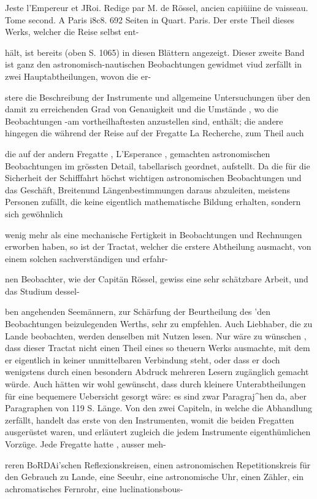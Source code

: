 \documentclass[10pt,a4paper]{article}
\begin{document}
Jeste l'Empereur et JRoi. Redige par M. de Rössel, ancien capiüiine de vaisseau. Tome second. A Paris i8c8. 692 Seiten in Quart. Paris. Der erste Theil dieses Werks, welcher die Reise selbst ent-

hält, ist bereits (oben S. 1065) in diesen Blättern angezeigt. Dieser zweite Band ist ganz den astronomisch-nautischen Beobachtungen gewidmet viud zerfällt in zwei Hauptabtheilungen, wovon die er-

stere die Beschreibung der Instrumente und allgemeine Untersuchungen über den damit zu erreichenden Grad von Genauigkeit und die Umstände , wo die Beobachtungen -am vortheilhaftesten anzustellen sind, enthält; die andere hingegen die während der Reise auf der Fregatte La Recherche, zum Theil auch

die auf der andern Fregatte , L'Esperance , gemachten astronomischen Beobachtungen im grössten Detail, tabellarisch geordnet, aufstellt. Da die für die Sicherheit der Schifffahrt höchst wichtigen astronomischen Beobachtungen und das Geschäft, Breitenund Längenbestimmungen daraus abzuleiten, meistens Personen zufällt, die keine eigentlich mathematische Bildung erhalten, sondern sich gewöhnlich

wenig mehr als eine mechanische Fertigkeit in Beobachtungen und Rechnungen erworben haben, so ist der Tractat, welcher die erstere Abtheilung ausmacht, von einem solchen sachverständigen und erfahr-

nen Beobachter, wie der Capitän Rössel, gewiss eine sehr schätzbare Arbeit, und das Studium dessel-

ben angehenden Seemännern, zur Schärfung der Beurtheilung des 'den Beobachtungen beizulegenden Werths, sehr zu empfehlen. Auch Liebhaber, die zu Lande beobachten, werden denselben mit Nutzen lesen. Nur wäre zu wünschen , dass dieser Tractat nicht einen Theil eines so theuern Werks ausmachte, mit dem er eigentlich in keiner unmittelbaren Verbindung steht, oder dass er doch wenigstens durch einen besondern Abdruck mehreren Lesern zugänglich gemacht würde. Auch hätten wir wohl gewünscht, dass durch kleinere Unterabtheilungen für eine bequemere Uebersicht gesorgt wäre: es sind zwar Paragraj\textasciicircum{}hen da, aber Paragraphen von 119 S. Länge. Von den zwei Capiteln, in welche die Abhandlung zerfällt, handelt das erste von den Instrumenten, womit die beiden Fregatten ausgerüstet waren, und erläutert zugleich die jedem Instrumente eigenthümlichen Vorzüge. Jede Fregatte hatte , ausser meh-

reren BoRDAi'schen Reflexionskreisen, einen astronomischen Repetitionskreis für den Gebrauch zu Lande, eine Seeuhr, eine astronomische Uhr, einen Zähler, ein achromatisches Fernrohr, eine luclinationsbous-
\end{document}
